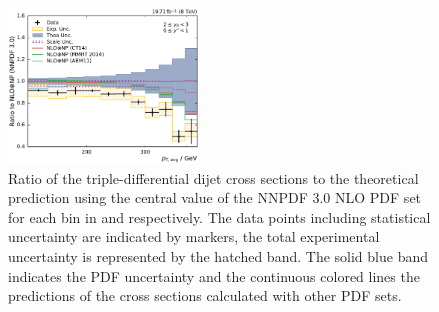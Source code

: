 \begin{figure}[htbp]
    \includegraphics[width=0.45\textwidth]{figures/measurement/ratio_to_NNPDF30+np_totcomp_yb2ys0.pdf}
    \caption[Ratio of measured cross sections to prediction using different PDFs]{
    Ratio of the triple-differential dijet cross sections to the theoretical
    prediction using the central value of the NNPDF 3.0 NLO PDF set for each bin in \ystar
    and \yboost respectively. The data points including statistical uncertainty are
    indicated by markers, the total experimental uncertainty is represented by the
    hatched band. The solid blue band indicates the PDF uncertainty and the
    continuous colored lines the predictions of the cross sections calculated with
    other PDF sets.}
    \label{fig:ratio_nnpdf30_nlo}
\end{figure}

